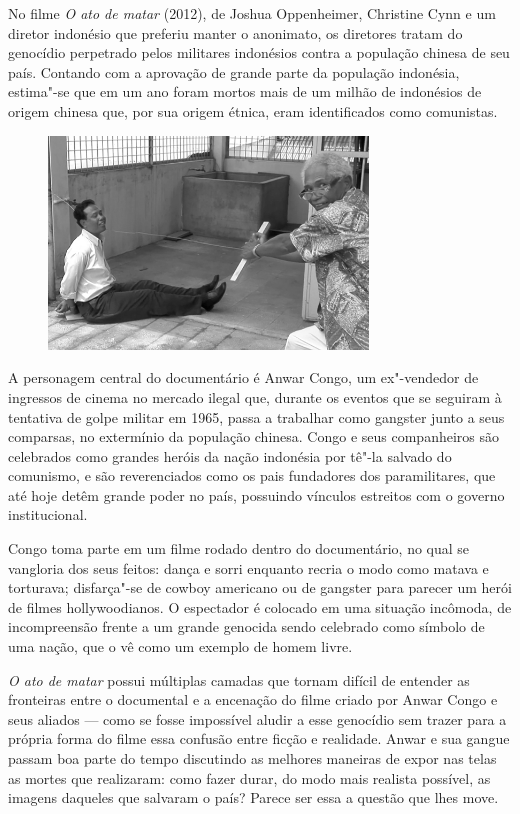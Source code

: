 \asterisc

No filme \emph{O ato de matar} (2012), de Joshua Oppenheimer, Christine
Cynn e um diretor indonésio que preferiu manter o anonimato, os
diretores tratam do genocídio perpetrado pelos militares indonésios
contra a população chinesa de seu país. Contando com a aprovação de grande parte
da população indonésia, estima"-se que em um ano foram mortos mais de um milhão de
indonésios de origem chinesa que, por sua origem étnica, eram identificados como comunistas.

\begin{figure}[!ht]
\centering
 \includegraphics[width=85mm]{./imgs/frame1.png}
\caption{\tiny{}}
\end{figure}


A personagem central do documentário é Anwar Congo, um ex"-vendedor de ingressos de
cinema no mercado ilegal que, durante os eventos que se seguiram à
tentativa de golpe militar em 1965, passa a trabalhar como gangster
junto a seus comparsas, no extermínio da população chinesa. Congo e seus
companheiros são celebrados como grandes heróis da nação indonésia por
tê"-la salvado do comunismo, e são reverenciados como os pais fundadores
dos paramilitares, que até hoje detêm grande poder no país, possuindo vínculos
estreitos com o governo institucional.

Congo toma parte em um filme rodado dentro do documentário, no qual se
vangloria dos seus feitos: dança e sorri enquanto recria o modo como
matava e torturava; disfarça"-se de cowboy americano ou de gangster para
parecer um herói de filmes hollywoodianos. O espectador é
colocado em uma situação incômoda, de incompreensão frente a um grande
genocida sendo celebrado como símbolo de uma nação, que o vê como um
exemplo de homem livre.

\emph{O ato de matar} possui múltiplas camadas que tornam difícil de
entender as fronteiras entre o documental e a encenação do filme criado
por Anwar Congo e seus aliados --- como se fosse impossível aludir a
esse genocídio sem trazer para a própria forma do filme essa confusão
entre ficção e realidade. Anwar e sua gangue passam boa parte do tempo
discutindo as melhores maneiras de expor nas telas as mortes que
realizaram: como fazer durar, do modo mais realista possível, as imagens
daqueles que salvaram o país? Parece ser essa a questão que lhes move.

